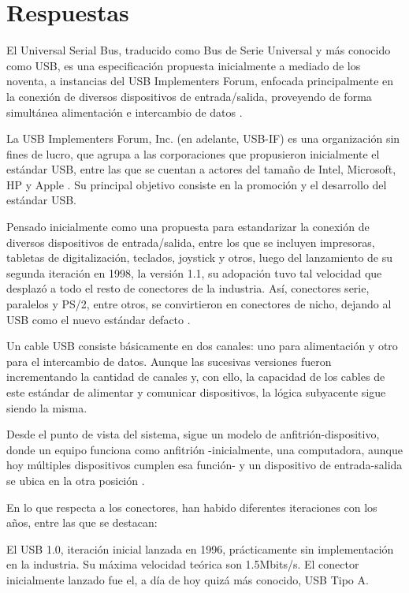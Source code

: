 \documentclass[12pt]{article}
\begin{document}
\pagebreak

\section{Respuestas}

El Universal Serial Bus,
traducido como Bus de Serie Universal y más conocido como USB, 
es una especificación propuesta inicialmente a mediado de los noventa, 
a instancias del USB Implementers Forum,
enfocada principalmente en la conexión de diversos dispositivos de entrada/salida,
proveyendo de forma simultánea alimentación e intercambio de datos \parencite{wikienusb}.

La USB Implementers Forum, Inc. (en adelante, USB-IF) es una organización sin fines de lucro,
que agrupa a las corporaciones que propusieron inicialmente el estándar USB,
entre las que se cuentan a actores del tamaño de Intel, Microsoft, HP y Apple \parencite{usbifabout}. 
Su principal objetivo consiste en la promoción y el desarrollo del estándar USB.

Pensado inicialmente como una propuesta para estandarizar la conexión de diversos dispositivos de entrada/salida,
entre los que se incluyen impresoras, tabletas de digitalización, teclados, joystick y otros,
luego del lanzamiento de su segunda iteración en 1998,
la versión 1.1,
su adopación tuvo tal velocidad que desplazó a todo el resto de conectores de la industria.
Así, conectores serie, paralelos y PS/2, 
entre otros, 
se convirtieron en conectores de nicho,
dejando al USB como el nuevo estándar defacto \parencite{wikiusb}.

Un cable USB consiste básicamente en dos canales: 
uno para alimentación y otro para el intercambio de datos.
Aunque las sucesivas versiones fueron incrementando la cantidad de canales y,
con ello,
la capacidad de los cables de este estándar de alimentar y comunicar dispositivos,
la lógica subyacente sigue siendo la misma.

Desde el punto de vista del sistema,
sigue un modelo de anfitrión-dispositivo,
donde un equipo funciona como anfitrión -inicialmente, 
una computadora, 
aunque hoy múltiples dispositivos cumplen esa función-
y un dispositivo de entrada-salida se ubica en la otra posición \parencite{wikienusb}.

En lo que respecta a los conectores,
han habido diferentes iteraciones con los años,
entre las que se destacan:

El USB 1.0,
iteración inicial lanzada en 1996,
prácticamente sin implementación en la industria.
Su máxima velocidad teórica son 1.5Mbits/s.
El conector inicialmente lanzado fue el,
a día de hoy quizá más conocido,
USB Tipo A.
\end{document}
